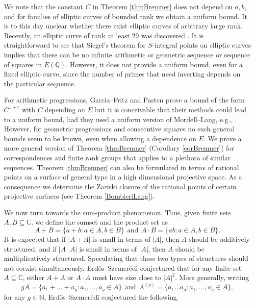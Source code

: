 \documentclass[12pt, reqno]{amsart}
\theoremstyle{remark}
\theoremstyle{definition}
\numberwithin{equation}{section}
\begin{document}
We note that the constant $C$ in Theorem \ref{thmBremner} does not depend on $a,b$, and for families of elliptic curves of bounded rank we obtain a uniform bound. It is to this day unclear whether there exist elliptic curves of arbitrary large rank. Recently, an elliptic curve of rank at least 29 was discovered \cite{rank_29_elliptic_curve, rank_records}. It is straightforward to see that Siegel's theorem for $S$-integral points \cite[Theorem D.9.1]{HindrySilverman} on elliptic curves implies that there can be no infinite arithmetic or geometric sequence or sequence of squares in $E(\mathbb{Q})$. However, it does not provide a uniform bound, even for a fixed elliptic curve, since the number of primes that need inverting depends on the particular sequence. 

 For arithmetic progressions, Garcia--Fritz and Pasten \cite{GFP2021} prove a bound of the form $C^{1 + r}$ with $C$ depending on $E$ but it is conceivable that their methods could lead to a uniform bound, had they used a uniform version of Mordell--Lang, e.g., \cite{DavidPhilippon}. However, for geometric progressions and consecutive squares no such general bounds seem to be known, even when allowing a dependence on $E$. We prove a more general version of Theorem \ref{thmBremner} (Corollary \ref{corBremner}) for correspondences and finite rank groups that applies to a plethora of similar sequences. Theorem \ref{thmBremner} can also be formulated in terms of rational points on a surface of general type in a high dimensional projective space. As a consequence we determine the Zariski closure of the rational points of certain projective surfaces (see Theorem \ref{BombieriLang}).


We now turn towards the sum-product phenomenon. Thus, 
given finite sets $A,B \subseteq \mathbb{C}$, we define the sumset and the product set as
\[ A+B = \{ a+ b : a \in A, b \in B\} \ \ \text{and} \ \ A\cdot B = \{ab : a \in A, b \in B\}.   \]
It is expected that if $|A+A|$ is small in terms of $|A|$, then $A$ should be additively structured, and if $|A \cdot A|$ is small in terms of $|A|$, then $A$ should be multiplicatively structured. Speculating that these two types of structures should not coexist simultaneously, Erd\H{o}s--Szemer\'{e}di \cite{Erdos--Szemeredi_on_sums_of_and_products_of_integers} conjectured that for any finite set $A \subseteq \mathbb{C}$, either $A+A$ or $A \cdot A$ must have size close to $|A|^2$. More generally, writing 
\[ gA = \{a_1 + \dots + a_g : a_1, \dots, a_g \in A\} \ \ \text{and} \ \ A^{(g)} = \{ a_1 \dots a_g : a_1, \dots, a_g \in A\}, \]
for any $g \in \mathbb{N}$, Erd\H{o}s--Szemer\'{e}di conjectured the following. 
\end{document}
